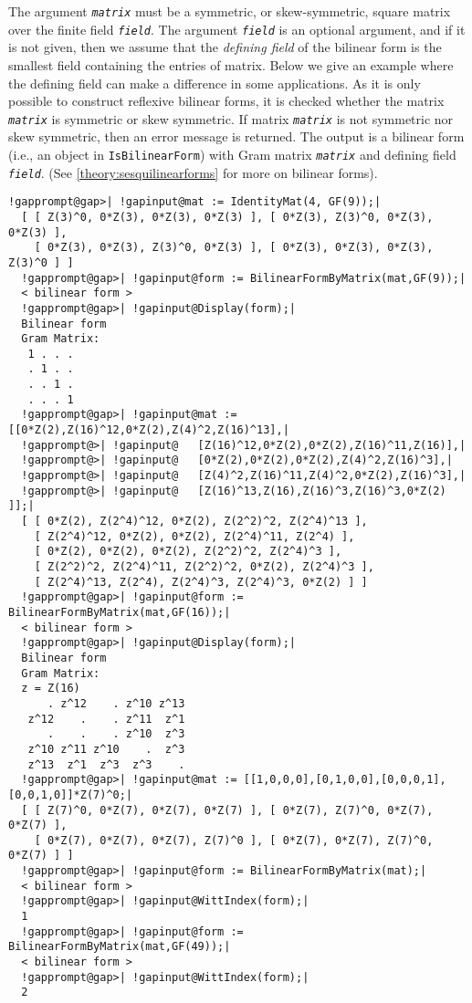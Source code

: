 \documentclass[a4paper,11pt]{report}
\begin{document}
{{{ The argument \mbox{\texttt{\mdseries\slshape matrix}} must be a symmetric, or skew-symmetric, square matrix over the finite field \mbox{\texttt{\mdseries\slshape field}}. The argument \mbox{\texttt{\mdseries\slshape field}} is an optional argument, and if it is not given, then we assume that the \emph{defining field} of the bilinear form is the smallest field containing the entries of matrix.
Below we give an example where the defining field can make a difference in
some applications. As it is only possible to construct reflexive bilinear
forms, it is checked whether the matrix \mbox{\texttt{\mdseries\slshape matrix}} is symmetric or skew symmetric. If matrix \mbox{\texttt{\mdseries\slshape matrix}} is not symmetric nor skew symmetric, then an error message is returned. The
output is a bilinear form (i.e., an object in \texttt{IsBilinearForm}) with Gram matrix \mbox{\texttt{\mdseries\slshape matrix}} and defining field \mbox{\texttt{\mdseries\slshape field}}. (See \ref{theory:sesquilinearforms} for more on bilinear forms). 
\begin{Verbatim}[commandchars=!@|,fontsize=\small,frame=single,label=Example]
  !gapprompt@gap>| !gapinput@mat := IdentityMat(4, GF(9));|
  [ [ Z(3)^0, 0*Z(3), 0*Z(3), 0*Z(3) ], [ 0*Z(3), Z(3)^0, 0*Z(3), 0*Z(3) ], 
    [ 0*Z(3), 0*Z(3), Z(3)^0, 0*Z(3) ], [ 0*Z(3), 0*Z(3), 0*Z(3), Z(3)^0 ] ]
  !gapprompt@gap>| !gapinput@form := BilinearFormByMatrix(mat,GF(9));|
  < bilinear form >
  !gapprompt@gap>| !gapinput@Display(form);|
  Bilinear form
  Gram Matrix:
   1 . . .
   . 1 . .
   . . 1 .
   . . . 1
  !gapprompt@gap>| !gapinput@mat := [[0*Z(2),Z(16)^12,0*Z(2),Z(4)^2,Z(16)^13],|
  !gapprompt@>| !gapinput@   [Z(16)^12,0*Z(2),0*Z(2),Z(16)^11,Z(16)],|
  !gapprompt@>| !gapinput@   [0*Z(2),0*Z(2),0*Z(2),Z(4)^2,Z(16)^3],|
  !gapprompt@>| !gapinput@   [Z(4)^2,Z(16)^11,Z(4)^2,0*Z(2),Z(16)^3],|
  !gapprompt@>| !gapinput@   [Z(16)^13,Z(16),Z(16)^3,Z(16)^3,0*Z(2) ]];|
  [ [ 0*Z(2), Z(2^4)^12, 0*Z(2), Z(2^2)^2, Z(2^4)^13 ], 
    [ Z(2^4)^12, 0*Z(2), 0*Z(2), Z(2^4)^11, Z(2^4) ], 
    [ 0*Z(2), 0*Z(2), 0*Z(2), Z(2^2)^2, Z(2^4)^3 ], 
    [ Z(2^2)^2, Z(2^4)^11, Z(2^2)^2, 0*Z(2), Z(2^4)^3 ], 
    [ Z(2^4)^13, Z(2^4), Z(2^4)^3, Z(2^4)^3, 0*Z(2) ] ]
  !gapprompt@gap>| !gapinput@form := BilinearFormByMatrix(mat,GF(16));|
  < bilinear form >
  !gapprompt@gap>| !gapinput@Display(form);|
  Bilinear form
  Gram Matrix:
  z = Z(16)
      . z^12    . z^10 z^13
   z^12    .    . z^11  z^1
      .    .    . z^10  z^3
   z^10 z^11 z^10    .  z^3
   z^13  z^1  z^3  z^3    .
  !gapprompt@gap>| !gapinput@mat := [[1,0,0,0],[0,1,0,0],[0,0,0,1],[0,0,1,0]]*Z(7)^0;|
  [ [ Z(7)^0, 0*Z(7), 0*Z(7), 0*Z(7) ], [ 0*Z(7), Z(7)^0, 0*Z(7), 0*Z(7) ], 
    [ 0*Z(7), 0*Z(7), 0*Z(7), Z(7)^0 ], [ 0*Z(7), 0*Z(7), Z(7)^0, 0*Z(7) ] ]
  !gapprompt@gap>| !gapinput@form := BilinearFormByMatrix(mat);|
  < bilinear form >
  !gapprompt@gap>| !gapinput@WittIndex(form);|
  1
  !gapprompt@gap>| !gapinput@form := BilinearFormByMatrix(mat,GF(49));|
  < bilinear form >
  !gapprompt@gap>| !gapinput@WittIndex(form);|
  2
   

\end{Verbatim}}}}
\end{document}
